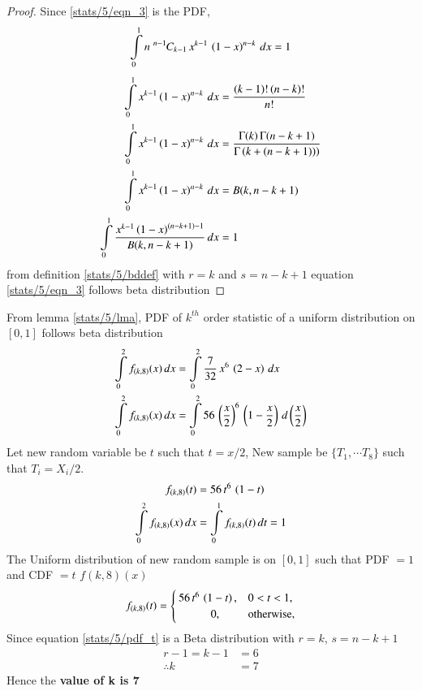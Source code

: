     \begin{proof}
    Since  \eqref{stats/5/eqn_3} is the PDF,
    \begin{equation}
     \int\limits_{0}^{1} n\;{{}^{n-1}\mkern-1muC_{k-1}}\,x^{k-1}\,\left(1-x\right)^{n-k} \,dx  = 1    
    \end{equation}
    \begin{align}
    \int\limits_{0}^{1} x^{k-1}\left(1-x\right)^{n-k} \,dx  &= \dfrac{(k-1)!\,(n-k)!}{n!}  \\
    \int\limits_{0}^{1} x^{k-1}\left(1-x\right)^{n-k} \,dx  &= \dfrac{\Gamma(k)\,\Gamma(n-k+1)}{\Gamma\left(k+(n-k+1))\right)} \\
    \int\limits_{0}^{1} x^{k-1}\left(1-x\right)^{n-k} \,dx  &= B(k,n-k+1) \\
    \int\limits_{0}^{1} \dfrac{x^{k-1}\left(1-x\right)^{(n-k+1)-1}}{B(k,n-k+1)}\,dx  &= 1
    \end{align}
    from definition \eqref{stats/5/bddef} with $r=k$ and $s=n-k+1$ equation \eqref{stats/5/eqn_3} follows beta distribution
    \end{proof}
    From lemma \eqref{stats/5/lma}, PDF of $k^{th}$ order statistic of a uniform distribution on $[0,1]$ follows 
    beta distribution
    \begin{align}
    \int\limits_{0}^{2}f_{(k,8)}(x)\,dx &= \int\limits_{0}^{2} \dfrac{7}{32}\,x^{6}\,\left(2-x\right)\,dx \\
    \int\limits_{0}^{2}f_{(k,8)}(x)\,dx &= \int\limits_{0}^{2} 56\,\left(\dfrac{x}{2}\right)^{6}\,\left(1-\dfrac{x}{2}\right)\,d\left(\dfrac{x}{2}\right)
    \end{align}
    Let new random variable be $t$ such that $t=x/2$, New sample be $\{T_1,\cdots T_8\}$ such that $T_{i}=X_{i}/2$.
    \begin{align}
    f_{(k,8)}(t) &= 56\,t^{6}\,\left(1-t\right) \\
    \int\limits_{0}^{2}f_{(k,8)}(x)\,dx &=  \int\limits_{0}^{1}f_{(k,8)}(t)\,dt = 1
    \end{align}
    The Uniform distribution of new random sample is on $[0,1]$ such that   PDF $= 1$ and CDF $= t$ 
    $f(k,8)(x)$ 
    \begin{align}
    f_{(k,8)}(t) =
      \begin{cases}
          56\,t^{6}\,\left(1-t\right),  & 0<t<1, \\ 
          \hspace{1cm}   0,               & \text{otherwise,} 
      \end{cases}
      \label{stats/5/pdf_t}
    \end{align}
    Since equation \eqref{stats/5/pdf_t} is a Beta distribution with $r=k$, $s=n-k+1$  
    \begin{align}
    r-1 = k-1 &= 6 \\
    \therefore k &= 7 
    \end{align}
    Hence the \textbf{value of k is 7}


    
